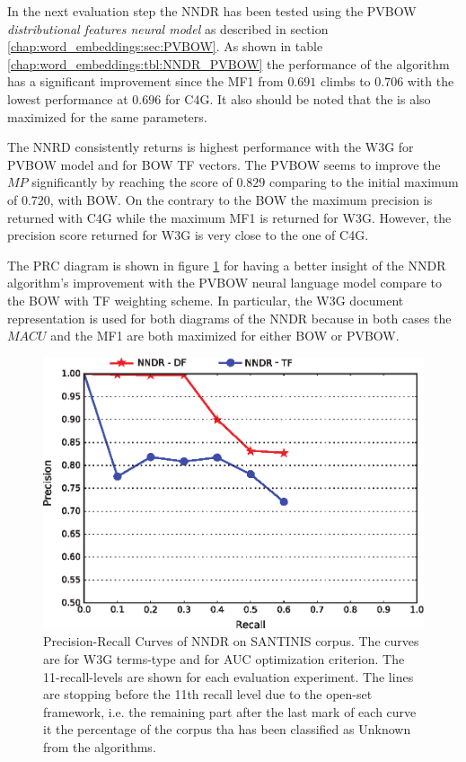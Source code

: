 {In the next evaluation step the NNDR has been tested using the PVBOW \textit{distributional features neural model }as described in section \ref{chap:word_embeddings:sec:PVBOW}. As shown in table \ref{chap:word_embeddings:tbl:NNDR_PVBOW} the performance of the algorithm has a significant improvement since the  MF1 from $0.691$ climbs to $0.706$ with the lowest performance at $0.696$ for C4G. It also should be noted that the is also maximized for the same parameters. 

The NNRD consistently returns is highest performance with the W3G for PVBOW model and for BOW TF vectors. The PVBOW seems to improve the $MP$ significantly by reaching the score of $0.829$ comparing to the initial maximum of $0.720$, with BOW. On the contrary to the BOW the maximum precision is returned with C4G while the maximum MF1 is returned for W3G. However, the precision score returned for W3G is very close to the one of C4G.

The PRC diagram is shown in figure  \ref{chap:word_embeddings:fig:NNDR_W3G} for having a better insight of the NNDR algorithm's improvement with the PVBOW neural language model compare to the BOW with TF weighting scheme. In particular, the W3G document representation is used for both diagrams of the NNDR because in both cases the $MACU$ and the MF1 are both maximized for either BOW or PVBOW.

\begin{figure}[H]

\begin{center}
\includegraphics[scale=0.99]{Figures/NNDR_W3G.eps}
\caption{Precision-Recall Curves of NNDR on SANTINIS corpus. The curves are for W3G terms-type and for AUC optimization criterion. The 11-recall-levels are shown for each evaluation experiment. The lines are stopping before the 11th recall level due to the open-set framework, i.e. the remaining part after the last mark of each curve it the percentage of the corpus tha has been classified as Unknown from the algorithms.}
\label{chap:word_embeddings:fig:NNDR_W3G}
\end{center}


\end{figure}}
